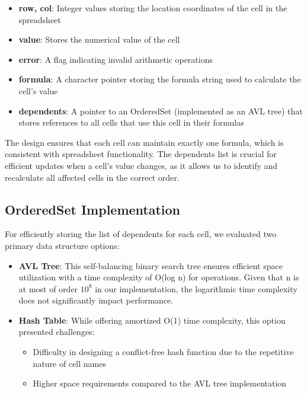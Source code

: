\documentclass[10pt,a4paper]{article}  %
\begin{document}
\begin{itemize}
    \item \textbf{row, col}: Integer values storing the location coordinates of the cell in the spreadsheet
    \item \textbf{value}: Stores the numerical value of the cell
    \item \textbf{error}: A flag indicating invalid arithmetic operations 
    \item \textbf{formula}: A character pointer storing the formula string used to calculate the cell's value
    \item \textbf{dependents}: A pointer to an OrderedSet (implemented as an AVL tree) that stores references to all cells that use this cell in their formulas
\end{itemize}

The design ensures that each cell can maintain exactly one formula, which is consistent with spreadsheet functionality. The dependents list is crucial for efficient updates when a cell's value changes, as it allows us to identify and recalculate all affected cells in the correct order.

\subsection{OrderedSet Implementation}
For efficiently storing the list of dependents for each cell, we evaluated two primary data structure options:

\begin{itemize}
    \item \textbf{AVL Tree}: This self-balancing binary search tree ensures efficient space utilization with a time complexity of O(log n) for operations. Given that n is at most of order $10^8$ in our implementation, the logarithmic time complexity does not significantly impact performance.
    
    \item \textbf{Hash Table}: While offering amortized O(1) time complexity, this option presented challenges:
    \begin{itemize}
        \item Difficulty in designing a conflict-free hash function due to the repetitive nature of cell names
        \item Higher space requirements compared to the AVL tree implementation
    \end{itemize}
\end{itemize}
\end{document}

